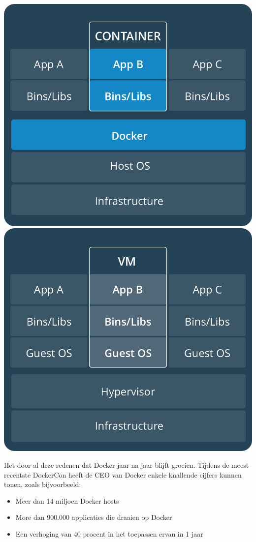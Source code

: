 \begin{center}
	\includegraphics[scale=0.2]{img/containers.png}
	\includegraphics[scale=0.2]{img/vms.png}
\end{center}

Het door al deze redenen dat Docker jaar na jaar blijft groeien. Tijdens de meest recentste DockerCon heeft de CEO van Docker enkele knallende cijfers kunnen tonen, zoals bijvoorbeeld:
\begin{itemize}[noitemsep]
	\item Meer dan 14 miljoen Docker hosts
	\item More dan 900.000 applicaties die draaien op Docker
	\item Een verhoging van 40 procent in het toepassen ervan in 1 jaar
\end{itemize}
~\autocite{DockerNumbers}

